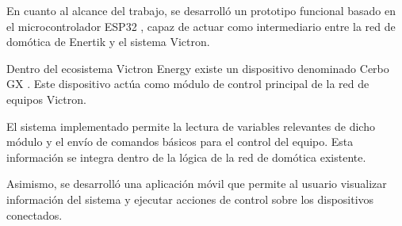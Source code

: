 En cuanto al alcance del trabajo, se desarrolló un prototipo funcional basado en el microcontrolador ESP32 \citep{web_espressif}, capaz de actuar como intermediario entre la red de domótica de Enertik y el sistema Victron.

Dentro del ecosistema Victron Energy existe un dispositivo denominado Cerbo GX \citep{web_cerbo_gx}. Este dispositivo actúa como módulo de control principal de la red de equipos Victron.

El sistema implementado permite la lectura de variables relevantes de dicho módulo y el envío de comandos básicos para el control del equipo. Esta información se integra dentro de la lógica de la red de domótica existente.

Asimismo, se desarrolló una aplicación móvil que permite al usuario visualizar información del sistema y ejecutar acciones de control sobre los dispositivos conectados.

